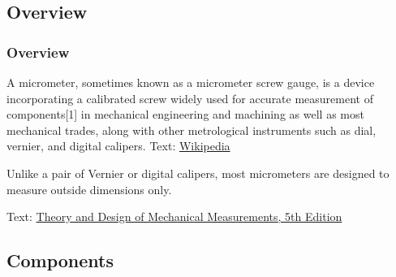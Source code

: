 \documentclass[fleqn]{beamer} %
\newcommand{\sectionIIsubsectionItitle}{Overview}
\newcommand{\sectionIIsubsectionIItitle}{Components}
\begin{document}
		\subsection{\sectionIIsubsectionItitle}\label{sectionIIsubsectionI}

			\begin{frame}[label=sectionIIsubsectionI]
				\frametitle{\sectionIIsubsectionItitle}

				A micrometer, sometimes known as a micrometer screw gauge, is a device incorporating a calibrated screw widely used for accurate measurement of components[1] in mechanical engineering and machining as well as most mechanical trades, along with other metrological instruments such as dial, vernier, and digital calipers. {\tiny Text: \href{https://en.wikipedia.org/wiki/Micrometer}{Wikipedia}}\vspc

				Unlike a pair of Vernier or digital calipers, most micrometers are designed to measure outside dimensions only. \vspc

				{\tiny Text: \underline{Theory and Design of Mechanical Measurements, 5th Edition}}
	
			\end{frame}

		\subsection{\sectionIIsubsectionIItitle}\label{sectionIIsubsectionII}
\end{document}
